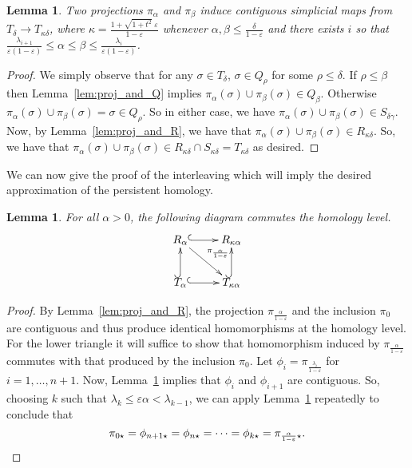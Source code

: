 \documentclass[a4paper]{article}
\newtheorem{lemma}[theorem]{Lemma}
\newcommand{\e}{\varepsilon}
\newcommand{\ir}{\lambda}
\newcommand{\proj}{\pi}
\begin{document}
  \begin{lemma}\label{lem:proj_and_T}
    Two projections $\proj_\alpha$ and $\proj_\beta$ induce contiguous simplicial maps from $T_\delta\to T_{\kappa\delta}$, where $\kappa = \frac{1 + \sqrt{1+t^2}\;\e}{1-\e}$ whenever $\alpha,\beta \le \frac{\delta}{1-\e}$ and there exists $i$ so that $\frac{\ir_{i+1}}{\e(1-\e)}\le \alpha \le \beta \le \frac{\ir_{i}}{\e(1-\e)}$.
  \end{lemma}
  \begin{proof}
    We simply observe that for any $\sigma\in T_\delta$, $\sigma\in Q_\rho$ for some $\rho\le \delta$.
    If $\rho\le \beta$ then Lemma~\ref{lem:proj_and_Q} implies $\proj_\alpha(\sigma) \cup \proj_\beta(\sigma) \in Q_\beta$.
    Otherwise $\proj_\alpha(\sigma) \cup \proj_\beta(\sigma) = \sigma \in Q_\rho$.
    So in either case, we have $\proj_\alpha(\sigma) \cup \proj_\beta(\sigma) \in S_{\delta \gamma}$.
    Now, by Lemma~\ref{lem:proj_and_R}, we have that $\proj_\alpha(\sigma) \cup \proj_\beta(\sigma) \in R_{\kappa\delta}$.
    So, we have that $\proj_\alpha(\sigma) \cup \proj_\beta(\sigma) \in R_{\kappa\delta} \cap S_{\kappa\delta} = T_{\kappa\delta}$ as desired.
  \end{proof}

  We can now give the proof of the interleaving which will imply the desired approximation of the persistent homology.

  \begin{lemma}\label{lem:interleaving}
    For all $\alpha>0$, the following diagram commutes the homology level.
    \[
      \xymatrix{
        R_{\alpha} \ar[dr]^{\proj_{\frac{\alpha}{1-\e}}} \ar@{^{(}->}[r] & R_{\kappa\alpha} \\
        T_{\alpha} \ar@{^{(}->}[r] \ar@{^{(}->}[u] & T_{\kappa\alpha} \ar@{^{(}->}[u]
      }
    \]
  \end{lemma}
  \begin{proof}
    By Lemma~\ref{lem:proj_and_R}, the projection $\proj_{\frac{\alpha}{1-\e}}$ and the inclusion $\proj_0$ are contiguous and thus produce identical homomorphisms at the homology level.
    For the lower triangle it will suffice to show that homomorphism induced by $\proj_{\frac{\alpha}{1-\e}}$ commutes with that produced by the inclusion $\proj_0$.
    Let $\phi_i = \proj_{\frac{\ir_i}{1-\e}}$ for $i=1,\ldots,n+1$.
    Now, Lemma~\ref{lem:proj_and_T} implies that $\phi_i$ and $\phi_{i+1}$ are contiguous.
    So, choosing $k$ such that $\ir_k \le \e\alpha <\ir_{k-1}$, we can apply Lemma~\ref{lem:proj_and_T} repeatedly to conclude that
    \[
      \proj_{0\star} = \phi_{n+1\star} =\phi_{n\star} = \cdots = \phi_{k\star} = \proj_{\frac{\alpha}{1-\e}\star}.\qedhere
    \]
  \end{proof}
\end{document}

